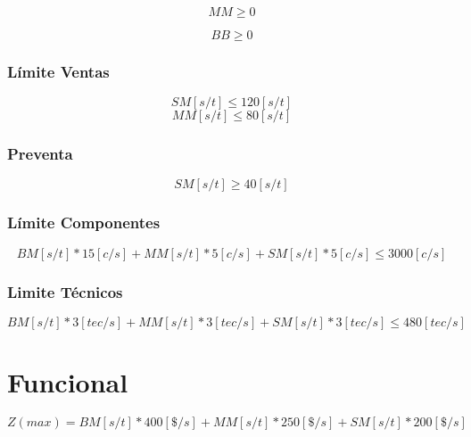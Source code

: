 \documentclass{article}
\begin{document}
\begin{equation}
	MM \geq 0
\end{equation}

\begin{equation}
	BB \geq 0
\end{equation}
\section{L\'imite Ventas}
\begin{equation}
	SM [s/t] \leq 120 [s/t]
\end{equation}
\begin{equation}
	MM [s/t] \leq 80 [s/t]
\end{equation}

\section{Preventa}
\begin{equation}
	SM [s/t] \geq 40 [s/t]
\end{equation}

\section{L\'imite Componentes} 
\begin{equation}
	BM [s/t] * 15 [c/s] + MM [s/t] * 5 [c/s] + SM [s/t] * 5 [c/s] \leq 3000 [c/s]
\end{equation}

\section{Limite T\'ecnicos}
\begin{equation}
	BM [s/t] * 3 [tec/s] + MM [s/t] * 3 [tec/s] + SM [s/t] * 3 [tec/s] \leq 480 [tec/s]
\end{equation}

\part{Funcional}
\begin{equation}
	Z(max) = BM [s/t] * 400 [\$/s] + MM [s/t] * 250 [\$/s] + SM [s/t] * 200 [\$/s]  
\end{equation}
\end{document}
